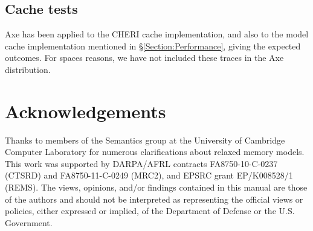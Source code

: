 \documentclass[11pt]{article}
\begin{document}
\subsection*{Cache tests}

Axe has been applied to the CHERI cache implementation, and also to
the model cache implementation mentioned in
\S\ref{Section:Performance}, giving the expected outcomes.  For spaces
reasons, we have not included these traces in the Axe
distribution.

\section{Acknowledgements}

Thanks to members of the Semantics group at the University of
Cambridge Computer Laboratory for numerous clarifications about
relaxed memory models.  This work was supported by DARPA/AFRL
contracts FA8750-10-C-0237 (CTSRD) and FA8750-11-C-0249 (MRC2), and
EPSRC grant EP/K008528/1 (REMS).  The views, opinions, and/or findings
contained in this manual are those of the authors and should not be
interpreted as representing the official views or policies, either
expressed or implied, of the Department of Defense or the U.S.
Government.
\end{document}
